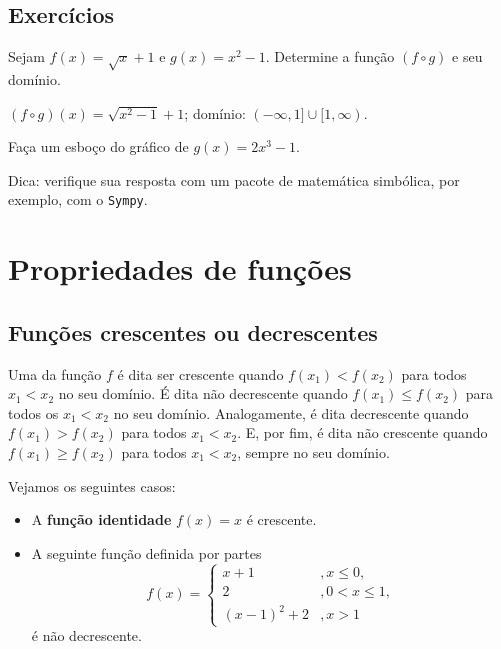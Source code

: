 \subsection*{Exercícios}

\begin{exer}
  Sejam $f(x) = \sqrt{x}+1$ e $g(x) = x^2 -1$. Determine a função $(f\circ g)$ e seu domínio.
\end{exer}
\begin{resp}
  $(f\circ g)(x) = \sqrt{x^2-1}+1$; domínio: $(-\infty, 1]\cup [1, \infty)$.
\end{resp}

\begin{exer}
  Faça um esboço do gráfico de $g(x) = 2x^3 - 1$.
\end{exer}
\begin{resp}
  Dica: verifique sua resposta com um pacote de matemática simbólica, por exemplo, com o \verb+Sympy+.
\end{resp}

\section{Propriedades de funções}\label{cap_funcao_sec_funprop}

\subsection{Funções crescentes ou decrescentes}

Uma da função $f$ é dita ser crescente quando $f(x_1)<f(x_2)$ para todos $x_1<x_2$ no seu domínio. É dita não decrescente quando $f(x_1)\leq f(x_2)$ para todos os $x_1<x_2$ no seu domínio. Analogamente, é dita decrescente quando $f(x_1)>f(x_2)$ para todos $x_1<x_2$. E, por fim, é dita não crescente quando $f(x_1)\geq f(x_2)$ para todos $x_1<x_2$, sempre no seu domínio.

\begin{ex}
  Vejamos os seguintes casos:
  \begin{itemize}
  \item A {\bf função identidade} $f(x)=x$ é crescente.
  \item A seguinte função definida por partes
    \begin{equation}
      f(x) = \left\{
        \begin{array}{ll}
          x+1 &,x\leq 0,\\
          2 &,0<x\leq 1,\\
          (x-1)^2+2 &, x>1
        \end{array}
\right.
\end{equation}
é não decrescente.
  \end{itemize}
\end{ex}

